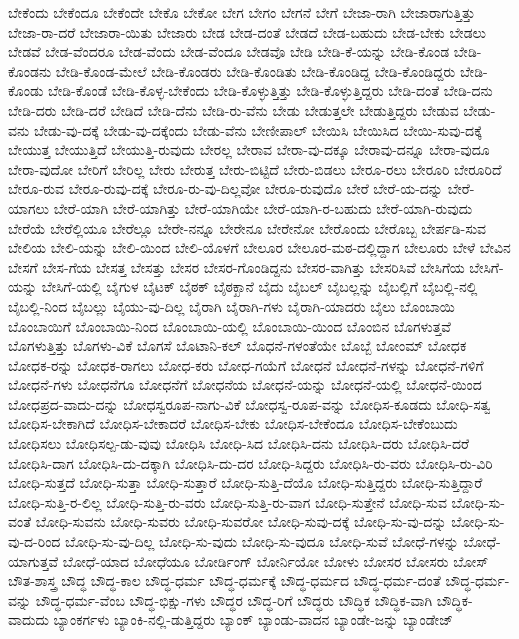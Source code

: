 {ಬೇಕೆಂದು
ಬೇಕೆಂದೂ
ಬೇಕೆಂದೇ
ಬೇಕೊ
ಬೇಕೋ
ಬೇಗ
ಬೇಗಂ
ಬೇಗನೆ
ಬೇಗೆ
ಬೇಜಾ-ರಾಗಿ
ಬೇಜಾರಾಗುತ್ತಿತ್ತು
ಬೇಜಾ-ರಾ-ದರೆ
ಬೇಜಾರಾ-ಯಿತು
ಬೇಜಾರು
ಬೇಡ
ಬೇಡ-ದಂತೆ
ಬೇಡದೆ
ಬೇಡ-ಬಹುದು
ಬೇಡ-ಬೇಕು
ಬೇಡಲು
ಬೇಡವೆ
ಬೇಡ-ವೆಂದರೂ
ಬೇಡ-ವೆಂದು
ಬೇಡ-ವೆಂದೂ
ಬೇಡವೊ
ಬೇಡಿ
ಬೇಡಿ-ಕೆ-ಯನ್ನು
ಬೇಡಿ-ಕೊಂಡ
ಬೇಡಿ-ಕೊಂಡನು
ಬೇಡಿ-ಕೊಂಡ-ಮೇಲೆ
ಬೇಡಿ-ಕೊಂಡರು
ಬೇಡಿ-ಕೊಂಡಿತು
ಬೇಡಿ-ಕೊಂಡಿದ್ದ
ಬೇಡಿ-ಕೊಂಡಿದ್ದರು
ಬೇಡಿ-ಕೊಂಡು
ಬೇಡಿ-ಕೊಂಡೆ
ಬೇಡಿ-ಕೊಳ್ಳ-ಬೇಕೆಂದು
ಬೇಡಿ-ಕೊಳ್ಳುತ್ತಿತ್ತು
ಬೇಡಿ-ಕೊಳ್ಳುತ್ತಿದ್ದರು
ಬೇಡಿ-ದಂತೆ
ಬೇಡಿ-ದನು
ಬೇಡಿ-ದರು
ಬೇಡಿ-ದರೆ
ಬೇಡಿದೆ
ಬೇಡಿ-ದೆನು
ಬೇಡಿ-ರು-ವೆನು
ಬೇಡು
ಬೇಡುತ್ತಲೇ
ಬೇಡುತ್ತಿದ್ದರು
ಬೇಡುವ
ಬೇಡು-ವನು
ಬೇಡು-ವು-ದಕ್ಕೆ
ಬೇಡು-ವು-ದಕ್ಕೆಂದು
ಬೇಡು-ವೆನು
ಬೇಣೀಪಾಲ್
ಬೇಯಿಸಿ
ಬೇಯಿಸಿದ
ಬೇಯಿ-ಸುವು-ದಕ್ಕೆ
ಬೇಯುತ್ತ
ಬೇಯುತ್ತಿದೆ
ಬೇಯುತ್ತಿ-ರುವುದು
ಬೇರಲ್ಲ
ಬೇರಾವ
ಬೇರಾ-ವು-ದಕ್ಕೂ
ಬೇರಾವು-ದನ್ನೂ
ಬೇರಾ-ವುದೂ
ಬೇರಾ-ವುದೋ
ಬೇರಿಗೆ
ಬೇರಿಲ್ಲ
ಬೇರು
ಬೇರುತ್ತ
ಬೇರು-ಬಿಟ್ಟಿದೆ
ಬೇರು-ಬಿಡಲು
ಬೇರೂ-ರಲು
ಬೇರೂರಿ
ಬೇರೂರಿದೆ
ಬೇರೂ-ರುವ
ಬೇರೂ-ರುವು-ದಕ್ಕೆ
ಬೇರೂ-ರು-ವು-ದಿಲ್ಲವೋ
ಬೇರೂ-ರುವುದೊ
ಬೇರೆ
ಬೇರೆ-ಯ-ದನ್ನು
ಬೇರೆ-ಯಾಗಲು
ಬೇರೆ-ಯಾಗಿ
ಬೇರೆ-ಯಾಗಿತ್ತು
ಬೇರೆ-ಯಾಗಿಯೇ
ಬೇರೆ-ಯಾಗಿ-ರ-ಬಹುದು
ಬೇರೆ-ಯಾಗಿ-ರುವುದು
ಬೇರೆಯೆ
ಬೇರೆಲ್ಲಿಯೂ
ಬೇರೆಲ್ಲೂ
ಬೇರೇ-ನನ್ನೂ
ಬೇರೇನೂ
ಬೇರೇನೋ
ಬೇರೊಂದು
ಬೇರೊಬ್ಬ
ಬೇರ್ಪಡಿ-ಸುವ
ಬೇಲಿಯ
ಬೇಲಿ-ಯನ್ನು
ಬೇಲಿ-ಯಿಂದ
ಬೇಲಿ-ಯೊಳಗೆ
ಬೇಲೂರ
ಬೇಲೂರ-ಮಠ-ದಲ್ಲಿದ್ದಾಗ
ಬೇಲೂರು
ಬೇಳೆ
ಬೇವಿನ
ಬೇಸಗೆ
ಬೇಸ-ಗೆಯ
ಬೇಸತ್ತ
ಬೇಸತ್ತು
ಬೇಸರ
ಬೇಸರ-ಗೊಂಡಿದ್ದನು
ಬೇಸರ-ವಾಗಿತ್ತು
ಬೇಸರಿಸಿವೆ
ಬೇಸಿಗೆಯ
ಬೇಸಿಗೆ-ಯನ್ನು
ಬೇಸಿಗೆ-ಯಲ್ಲಿ
ಬೈಗುಳ
ಬೈಟಕ್
ಬೈಠಕ್
ಬೈಠಕ್ಖಾನೆ
ಬೈದು
ಬೈಬಲ್
ಬೈಬಲ್ಲನ್ನು
ಬೈಬಲ್ಲಿಗೆ
ಬೈಬಲ್ಲಿ-ನಲ್ಲಿ
ಬೈಬಲ್ಲಿ-ನಿಂದ
ಬೈಬಲ್ಲು
ಬೈಯು-ವು-ದಿಲ್ಲ
ಬೈರಾಗಿ
ಬೈರಾಗಿ-ಗಳು
ಬೈರಾಗಿ-ಯಾದರು
ಬೈಲು
ಬೊಂಬಾಯಿ
ಬೊಂಬಾಯಿಗೆ
ಬೊಂಬಾಯಿ-ನಿಂದ
ಬೊಂಬಾಯಿ-ಯಲ್ಲಿ
ಬೊಂಬಾಯಿ-ಯಿಂದ
ಬೊಂಬಿನ
ಬೊಗಳುತ್ತವೆ
ಬೊಗಳುತ್ತಿತ್ತು
ಬೊಗಳು-ವಿಕೆ
ಬೊಗಸೆ
ಬೊಟಾನಿ-ಕಲ್
ಬೊಧನೆ-ಗಳಂತೆಯೇ
ಬೊಬ್ಬೆ
ಬೋಂಮ್
ಬೋಧಕ
ಬೋಧಕ-ರನ್ನು
ಬೋಧಕ-ರಾಗಲು
ಬೋಧ-ಕರು
ಬೋಧ-ಗಯೆಗೆ
ಬೋಧನೆ
ಬೋಧನೆ-ಗಳನ್ನು
ಬೋಧನೆ-ಗಳಿಗೆ
ಬೋಧನೆ-ಗಳು
ಬೋಧನೆಗೂ
ಬೋಧನೆಗೆ
ಬೋಧನೆಯ
ಬೋಧನೆ-ಯನ್ನು
ಬೋಧನೆ-ಯಲ್ಲಿ
ಬೋಧನೆ-ಯಿಂದ
ಬೋಧಪ್ರದ-ವಾದು-ದನ್ನು
ಬೋಧಸ್ವರೂಪ-ನಾಗು-ವಿಕೆ
ಬೋಧಸ್ವ-ರೂಪ-ವನ್ನು
ಬೋಧಿಸ-ಕೂಡದು
ಬೋಧಿ-ಸತ್ವ
ಬೋಧಿಸ-ಬೇಕಾಗಿದೆ
ಬೋಧಿಸ-ಬೇಕಾದರೆ
ಬೋಧಿಸ-ಬೇಕು
ಬೋಧಿಸ-ಬೇಕೆಂದೂ
ಬೋಧಿಸ-ಬೇಕೆಂಬುದು
ಬೋಧಿಸಲು
ಬೋಧಿಸಲ್ಪ-ಡು-ವುವು
ಬೋಧಿಸಿ
ಬೋಧಿ-ಸಿದ
ಬೋಧಿಸಿ-ದನು
ಬೋಧಿಸಿ-ದರು
ಬೋಧಿಸಿ-ದರೆ
ಬೋಧಿಸಿ-ದಾಗ
ಬೋಧಿಸಿ-ದು-ದಕ್ಕಾಗಿ
ಬೋಧಿಸಿ-ದು-ದರ
ಬೋಧಿ-ಸಿದ್ದರು
ಬೋಧಿಸಿ-ರು-ವರು
ಬೋಧಿಸಿ-ರು-ವಿರಿ
ಬೋಧಿ-ಸುತ್ತದೆ
ಬೋಧಿ-ಸುತ್ತಾ
ಬೋಧಿ-ಸುತ್ತಾರೆ
ಬೋಧಿ-ಸುತ್ತಿ-ದೆಯೊ
ಬೋಧಿ-ಸುತ್ತಿದ್ದರು
ಬೋಧಿ-ಸುತ್ತಿದ್ದಾರೆ
ಬೋಧಿ-ಸುತ್ತಿ-ರ-ಲಿಲ್ಲ
ಬೋಧಿ-ಸುತ್ತಿ-ರು-ವರು
ಬೋಧಿ-ಸುತ್ತಿ-ರು-ವಾಗ
ಬೋಧಿ-ಸುತ್ತೇನೆ
ಬೋಧಿ-ಸುವ
ಬೋಧಿ-ಸು-ವಂತೆ
ಬೋಧಿ-ಸುವನು
ಬೋಧಿ-ಸುವರು
ಬೋಧಿ-ಸುವರೋ
ಬೋಧಿ-ಸುವು-ದಕ್ಕೆ
ಬೋಧಿ-ಸು-ವು-ದನ್ನು
ಬೋಧಿ-ಸು-ವು-ದ-ರಿಂದ
ಬೋಧಿ-ಸು-ವು-ದಿಲ್ಲ
ಬೋಧಿ-ಸು-ವುದು
ಬೋಧಿ-ಸು-ವುದೂ
ಬೋಧಿ-ಸುವೆ
ಬೋಧೆ-ಗಳನ್ನು
ಬೋಧೆ-ಯಾಗುತ್ತವೆ
ಬೋಧೆ-ಯಾದ
ಬೋಧೆಯೂ
ಬೋರ್ಡಿಂಗ್
ಬೋರ್ನಿಯೋ
ಬೋಳು
ಬೋಸರ
ಬೋಸರು
ಬೋಸ್
ಬೌತ-ಶಾಸ್ತ್ರ
ಬೌದ್ಧ
ಬೌದ್ಧ-ಕಾಲ
ಬೌದ್ಧ-ಧರ್ಮ
ಬೌದ್ಧ-ಧರ್ಮಕ್ಕೆ
ಬೌದ್ಧ-ಧರ್ಮದ
ಬೌದ್ಧ-ಧರ್ಮ-ದಂತೆ
ಬೌದ್ಧ-ಧರ್ಮ-ವನ್ನು
ಬೌದ್ಧ-ಧರ್ಮ-ವೆಂಬ
ಬೌದ್ಧ-ಭಿಕ್ಷು-ಗಳು
ಬೌದ್ಧರ
ಬೌದ್ಧ-ರಿಗೆ
ಬೌದ್ಧರು
ಬೌದ್ಧಿಕ
ಬೌದ್ಧಿಕ-ವಾಗಿ
ಬೌದ್ಧಿಕ-ವಾದುದು
ಬ್ಯಾಂಕರ್ಗಳು
ಬ್ಯಾಂಕಿ-ನಲ್ಲಿ-ಡುತ್ತಿದ್ದರು
ಬ್ಯಾಂಕ್
ಬ್ಯಾಂಡು-ವಾದನ
ಬ್ಯಾಂಡೇ-ಜನ್ನು
ಬ್ಯಾಂಡೇಜ್
}
